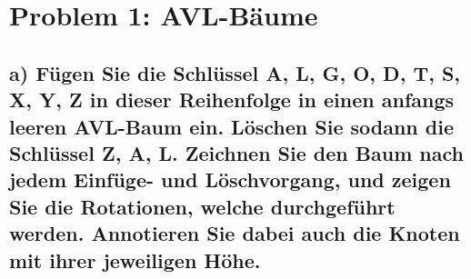 
\section*{{Problem 1: AVL-Bäume}}


\subsection*{a) Fügen Sie die Schlüssel A, L, G, O, D, T, S, X, Y, Z in dieser Reihenfolge in einen anfangs leeren AVL-Baum ein. Löschen Sie sodann die Schlüssel Z, A, L. Zeichnen Sie den Baum nach jedem Einfüge- und Löschvorgang, und zeigen Sie die Rotationen, welche durchgeführt werden. Annotieren Sie dabei auch die Knoten mit ihrer jeweiligen Höhe.} 


